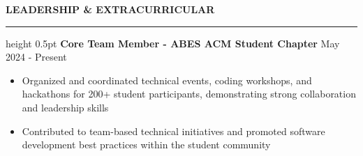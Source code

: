 \documentclass[11pt,a4paper]{article}
\newcommand{\sectionheader}[1]{%
    \par\addtolength{\topsep}{0.5\baselineskip}%
    {\large\textbf{\uppercase{#1}}}\par%
    \nopagebreak\vspace{-1em}\nopagebreak\hrule height 0.5pt\endgraf%
    \nopagebreak\vspace{0.25em}\nopagebreak}
\begin{document}
\sectionheader{Leadership \& Extracurricular}
\textbf{Core Team Member - ABES ACM Student Chapter} \hfill May 2024 - Present\\
\begin{itemize}[leftmargin=*,noitemsep,topsep=0pt]
    \item Organized and coordinated technical events, coding workshops, and hackathons for 200+ student participants, demonstrating strong collaboration and leadership skills
    \item Contributed to team-based technical initiatives and promoted software development best practices within the student community
\end{itemize}\par
\end{document}

